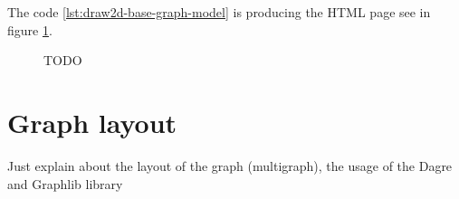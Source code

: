 The code \ref{lst:draw2d-base-graph-model} is producing the HTML page see in figure \ref{fig:base-graph-model-html-draw2d}.

\begin{figure}[h]%
    \centering
    \caption[TODO]{TODO}
    \label{fig:base-graph-model-html-draw2d}
\end{figure}%



\section{Graph layout} %
\label{sec:graph-layout}

Just explain about the layout of the graph (multigraph), the usage of the Dagre and Graphlib library



